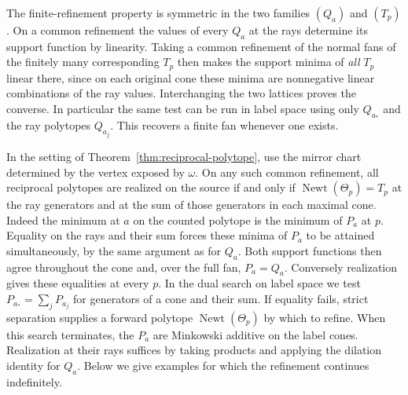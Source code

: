 \documentclass[11pt,reqno]{amsart}
\numberwithin{equation}{section}
\theoremstyle{definition}
\theoremstyle{remark}
\DeclareMathOperator{\Newt}{Newt}
\begin{document}
The finite-refinement property is symmetric in the two families
\((Q_a)\) and \((T_p)\). On a common refinement the values of every
\(Q_a\) at the rays determine its support function by linearity.
Taking a common refinement of the normal fans of the finitely many
corresponding \(T_p\) then makes the support minima of \emph{all}
\(T_p\) linear there, since on each original cone these minima are
nonnegative linear combinations of the ray values. Interchanging
the two lattices proves the converse. In particular the same test
can be run in label space using only \(Q_{a_*}\) and the ray polytopes
\(Q_{a_j}\). This recovers a finite fan whenever one exists.

In the setting of Theorem~\ref{thm:reciprocal-polytope}, use the
mirror chart determined by the vertex exposed by \(\omega\).
On any such common refinement, all reciprocal polytopes are realized
on the source if and only if
\(\Newt(\Theta_p)=T_p\)
at the ray generators and at the sum of those generators in each
maximal cone. Indeed the minimum at \(a\) on the counted polytope
is the minimum of \(P_a\) at \(p\). Equality on the rays and their
sum forces these minima of \(P_a\) to be attained simultaneously,
by the same argument as for \(Q_a\). Both support functions then
agree throughout the cone and, over the full fan, \(P_a=Q_a\).
Conversely realization gives these equalities at every \(p\).
In the dual search on label space we test
\(P_{a_*}=\sum_jP_{a_j}\) for generators of a cone and their sum. If equality fails,
strict separation supplies a forward polytope \(\Newt(\Theta_p)\)
by which to refine. When this search terminates, the \(P_a\) are
Minkowski additive on the label cones. Realization at their rays
suffices by taking products and applying the dilation identity for
\(Q_a\). Below we give examples for which the refinement continues indefinitely.
\end{document}

